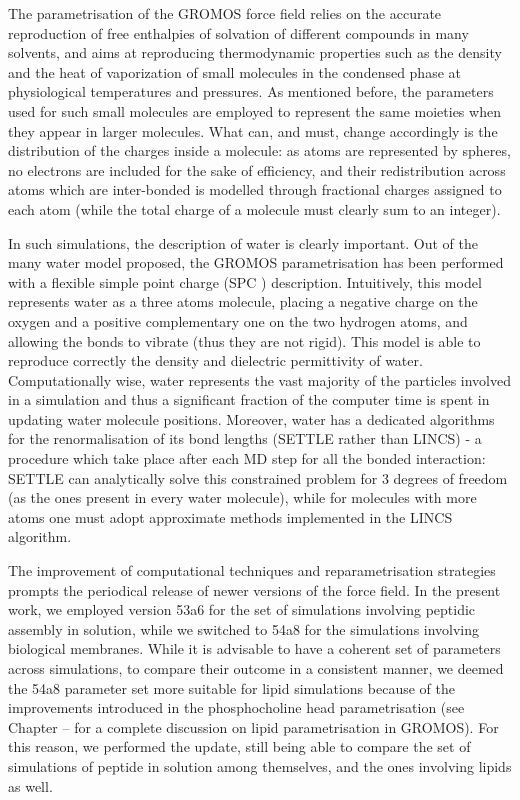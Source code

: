 The parametrisation of the GROMOS force field relies on the accurate reproduction of free enthalpies of solvation of different compounds in many solvents, and aims at reproducing thermodynamic properties such as the density and the heat of vaporization of small molecules in the condensed phase at physiological temperatures and pressures.
%
As mentioned before, the parameters used for such small molecules are employed to represent the same moieties when they appear in larger molecules. What can, and must, change accordingly is the distribution of the charges inside a molecule: as atoms are represented by spheres, no electrons are included for the sake of efficiency, and their redistribution across atoms which are inter-bonded is modelled through fractional charges assigned to each atom (while the total charge of a molecule must clearly sum to an integer).

In such simulations, the description of water is clearly important. Out of the many water model proposed, the GROMOS parametrisation has been performed with a flexible simple point charge (SPC \cite{Berendsen1981}) description. Intuitively, this model represents water as a three atoms molecule, placing a negative charge on the oxygen and a positive complementary one on the two hydrogen atoms, and allowing the bonds to vibrate (thus they are not rigid). This model is able to reproduce correctly the density and dielectric permittivity of water. Computationally wise, water represents the vast majority of the particles involved in a simulation and thus a significant fraction of the computer time is spent in updating water molecule positions.
%
Moreover, water has a dedicated algorithms for the renormalisation of its bond lengths (SETTLE rather than LINCS) - a procedure which take place after each MD step for all the bonded interaction: SETTLE \cite{Miyamoto1992} can analytically solve this constrained problem for 3 degrees of freedom (as the ones present in every water molecule), while for molecules with more atoms one must adopt approximate methods implemented in the LINCS \cite{Hess1997} algorithm.

The improvement of computational techniques and reparametrisation strategies prompts the periodical release of newer versions of the force field. In the present work, we employed version 53a6 \cite{Oostenbrink2004} for the set of simulations involving peptidic assembly in solution, while we switched to 54a8 \cite{Schmid2011} for the simulations involving biological membranes. While it is advisable to have a coherent set of parameters across simulations, to compare their outcome in a consistent manner, we deemed the 54a8 parameter set more suitable for lipid simulations because of the improvements introduced in the phosphocholine head parametrisation (see Chapter -- for a complete discussion on lipid parametrisation in GROMOS). For this reason, we performed the update, still being able to compare the set of simulations of peptide in solution among themselves, and the ones involving lipids as well.


